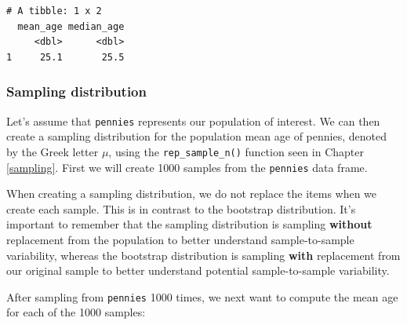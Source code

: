 \documentclass[12pt,]{krantz}
\makeatletter
\newenvironment{Shaded}{\begin{snugshade}}{\end{snugshade}}
\newcommand{\KeywordTok}[1]{\textcolor[rgb]{0.27,0.27,0.27}{\textbf{#1}}}
\newcommand{\DataTypeTok}[1]{\textcolor[rgb]{0.27,0.27,0.27}{#1}}
\newcommand{\DecValTok}[1]{\textcolor[rgb]{0.06,0.06,0.06}{#1}}
\newcommand{\StringTok}[1]{\textcolor[rgb]{0.5,0.5,0.5}{#1}}
\newcommand{\OtherTok}[1]{\textcolor[rgb]{0.37,0.37,0.37}{#1}}
\newcommand{\OperatorTok}[1]{\textcolor[rgb]{0.43,0.43,0.43}{\textbf{#1}}}
\newcommand{\NormalTok}[1]{#1}
\newenvironment{kframe}{%
\medskip{}
\setlength{\fboxsep}{.8em}
 \def\at@end@of@kframe{}%
 \ifinner\ifhmode%
  \def\at@end@of@kframe{\end{minipage}}%
  \begin{minipage}{\columnwidth}%
 \fi\fi%
 \def\FrameCommand##1{\hskip\@totalleftmargin \hskip-\fboxsep
 \colorbox{shadecolor}{##1}\hskip-\fboxsep
     \hskip-\linewidth \hskip-\@totalleftmargin \hskip\columnwidth}%
 \MakeFramed {\advance\hsize-\width
   \@totalleftmargin\z@ \linewidth\hsize
   \@setminipage}}%
 {\par\unskip\endMakeFramed%
 \at@end@of@kframe}
\renewenvironment{Shaded}{\begin{kframe}}{\end{kframe}}
\theoremstyle{definition}
\theoremstyle{definition}
\theoremstyle{definition}
\theoremstyle{remark}
\makeatother
\begin{document}
\begin{verbatim}
# A tibble: 1 x 2
  mean_age median_age
     <dbl>      <dbl>
1     25.1       25.5
\end{verbatim}

\subsubsection*{Sampling distribution}\label{sampling-distribution}


Let's assume that \texttt{pennies} represents our population of
interest. We can then create a sampling distribution for the population
mean age of pennies, denoted by the Greek letter \(\mu\), using the
\texttt{rep\_sample\_n()} function seen in Chapter \ref{sampling}. First
we will create 1000 samples from the \texttt{pennies} data frame.

\begin{Shaded}
\end{Shaded}

When creating a sampling distribution, we do not replace the items when
we create each sample. This is in contrast to the bootstrap
distribution. It's important to remember that the sampling distribution
is sampling \textbf{without} replacement from the population to better
understand sample-to-sample variability, whereas the bootstrap
distribution is sampling \textbf{with} replacement from our original
sample to better understand potential sample-to-sample variability.

After sampling from \texttt{pennies} 1000 times, we next want to compute
the mean age for each of the 1000 samples:

\begin{Shaded}
\end{Shaded}
\end{document}
